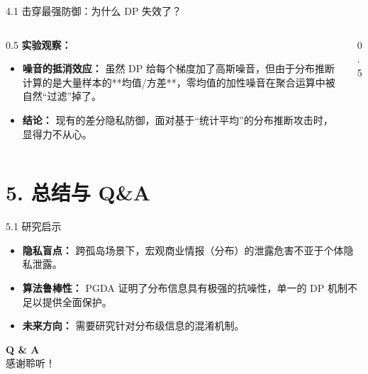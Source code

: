 \documentclass[aspectratio=169]{beamer} %
\begin{document}
\begin{frame}{4.1 击穿最强防御：为什么 DP 失效了？}
    \begin{columns}
        \begin{column}{0.5\textwidth}
            \textbf{实验观察：}
            \begin{itemize}
                \item \textbf{噪音的抵消效应：} 虽然 DP 给每个梯度加了高斯噪音，但由于分布推断计算的是大量样本的**均值/方差**，零均值的加性噪音在聚合运算中被自然“过滤”掉了。
                \item \textbf{结论：} 现有的差分隐私防御，面对基于“统计平均”的分布推断攻击时，显得力不从心。
            \end{itemize}
        \end{column}
        \begin{column}{0.5\textwidth}
            \begin{center}
            \end{center}
        \end{column}
    \end{columns}
\end{frame}

\section{5. 总结与 Q\&A}

\begin{frame}{5.1 研究启示}
    \begin{tcolorbox}[colback=blue!5,colframe=myblue,title=核心结论 (Takeaways)]
        \begin{itemize}
            \item \textbf{隐私盲点：} 跨孤岛场景下，宏观商业情报（分布）的泄露危害不亚于个体隐私泄露。
            \item \textbf{算法鲁棒性：} PGDA 证明了分布信息具有极强的抗噪性，单一的 DP 机制不足以提供全面保护。
            \item \textbf{未来方向：} 需要研究针对分布级信息的混淆机制。
        \end{itemize}
    \end{tcolorbox}
\end{frame}

\begin{frame}
    \begin{center}
        \Huge \textbf{Q \& A} \\
        \vspace{1cm}
        \Large 感谢聆听！
    \end{center}
\end{frame}
\end{document}
